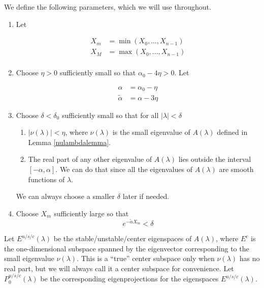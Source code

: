 \documentclass[12pt]{article}
\begin{document}
We define the following parameters, which we will use throughout.

\begin{enumerate}
	\item Let

	\begin{align*}
	X_m &= \min(X_0, \dots, X_{n-1}) \\
	X_M &= \max(X_0, \dots, X_{n-1}) \\
	\end{align*}

	\item Choose $\eta > 0$ sufficiently small so that $\alpha_0 - 4 \eta > 0$. Let

	\begin{align*}
	\alpha &= \alpha_0 - \eta \\
	\tilde{\alpha} &= \alpha - 3 \eta
	\end{align*}

	\item Choose $\delta < \delta_0$ sufficiently small so that for all $|\lambda| < \delta$
	\begin{enumerate}
		\item $|\nu(\lambda)| < \eta$, where $\nu(\lambda)$ is the small eigenvalue of $A(\lambda)$ defined in Lemma \ref{nulambdalemma}.
		\item The real part of any other eigenvalue of $A(\lambda)$ lies outside the interval $[-\alpha, \alpha]$. We can do that since all the eigenvalues of $A(\lambda)$ are smooth functions of $\lambda$.
	\end{enumerate}
	We can always choose a smaller $\delta$ later if needed.

	\item Choose $X_m$ sufficiently large so that
	\begin{equation}
	e^{-\tilde{\alpha} X_m} < \delta
	\end{equation}
\end{enumerate}

Let $E^{u/s/c}(\lambda)$ be the stable/unstable/center eigenspaces of $A(\lambda)$, where $E^c$ is the one-dimensional subspace spanned by the eigenvector corresponding to the small eigenvalue $\nu(\lambda)$. This is a ``true'' center subspace only when $\nu(\lambda)$ has no real part, but we will always call it a center subspace for convenience. Let $P^{u/s/c}_0(\lambda)$ be the corresponding eigenprojections for the eigenspaces $E^{u/s/c}(\lambda)$.\\
\end{document}

